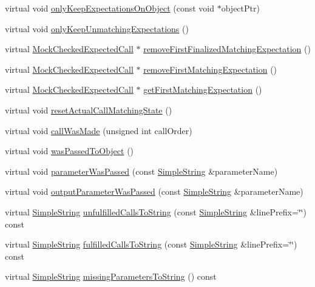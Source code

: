 \begin{DoxyCompactItemize}
\item 
virtual void \hyperlink{class_mock_expected_calls_list_a4532e75c2db152553976d924441eba2a}{only\+Keep\+Expectations\+On\+Object} (const void $\ast$object\+Ptr)
\item 
virtual void \hyperlink{class_mock_expected_calls_list_a5fb8122e66b99f6e196b29a0f6f1bd28}{only\+Keep\+Unmatching\+Expectations} ()
\item 
virtual \hyperlink{class_mock_checked_expected_call}{Mock\+Checked\+Expected\+Call} $\ast$ \hyperlink{class_mock_expected_calls_list_a1a73fba9891c64207b06fb3f83fdad75}{remove\+First\+Finalized\+Matching\+Expectation} ()
\item 
virtual \hyperlink{class_mock_checked_expected_call}{Mock\+Checked\+Expected\+Call} $\ast$ \hyperlink{class_mock_expected_calls_list_ac8726365c168eec6edba33716889bc69}{remove\+First\+Matching\+Expectation} ()
\item 
virtual \hyperlink{class_mock_checked_expected_call}{Mock\+Checked\+Expected\+Call} $\ast$ \hyperlink{class_mock_expected_calls_list_ab6c35f9ece49ce41eae2d46ed7b94a1d}{get\+First\+Matching\+Expectation} ()
\item 
virtual void \hyperlink{class_mock_expected_calls_list_a4c7ee87e12972e0504de732ae6f90177}{reset\+Actual\+Call\+Matching\+State} ()
\item 
virtual void \hyperlink{class_mock_expected_calls_list_a6e2b7989a09a51036edbafebda0e012a}{call\+Was\+Made} (unsigned int call\+Order)
\item 
virtual void \hyperlink{class_mock_expected_calls_list_a9a3f1eec5ad45ccae942edb3073279de}{was\+Passed\+To\+Object} ()
\item 
virtual void \hyperlink{class_mock_expected_calls_list_a236efae763fa47a7df636a5e148b6c31}{parameter\+Was\+Passed} (const \hyperlink{class_simple_string}{Simple\+String} \&parameter\+Name)
\item 
virtual void \hyperlink{class_mock_expected_calls_list_ac2fed7fbbb6573c72c6bba4edcee4701}{output\+Parameter\+Was\+Passed} (const \hyperlink{class_simple_string}{Simple\+String} \&parameter\+Name)
\item 
virtual \hyperlink{class_simple_string}{Simple\+String} \hyperlink{class_mock_expected_calls_list_a81cdcb1eb8447b6835fd9c81df9cfa4e}{unfulfilled\+Calls\+To\+String} (const \hyperlink{class_simple_string}{Simple\+String} \&line\+Prefix=\char`\"{}\char`\"{}) const 
\item 
virtual \hyperlink{class_simple_string}{Simple\+String} \hyperlink{class_mock_expected_calls_list_a66959cff61f39f0857b2523e000c1e8c}{fulfilled\+Calls\+To\+String} (const \hyperlink{class_simple_string}{Simple\+String} \&line\+Prefix=\char`\"{}\char`\"{}) const 
\item 
virtual \hyperlink{class_simple_string}{Simple\+String} \hyperlink{class_mock_expected_calls_list_a191036eb1f8823286092ad3519820b38}{missing\+Parameters\+To\+String} () const 
\end{DoxyCompactItemize}
